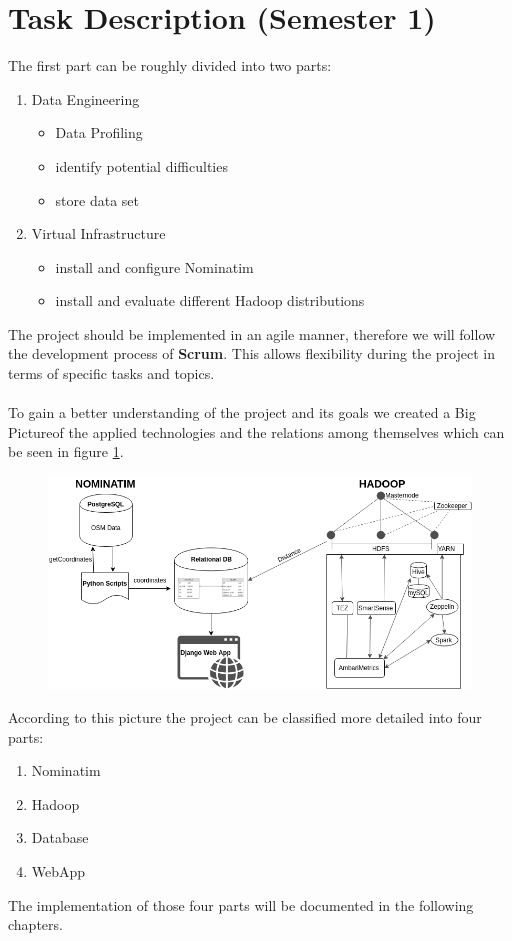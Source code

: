 
\section{Task Description (Semester 1)}\label{tasks}

The first part can be roughly divided into two parts:
\begin{enumerate}
\item Data Engineering
\begin{itemize}
\item Data Profiling
\item identify potential difficulties
\item store data set
\end{itemize}
\item Virtual Infrastructure
\begin{itemize}
\item install and configure Nominatim
\item install and evaluate different Hadoop distributions
\end{itemize}
\end{enumerate}
The project should be implemented in an agile manner, therefore we will follow the development process of \textbf{Scrum}. This allows flexibility during the project in terms of specific tasks and topics.
\\\\
To gain a better understanding of the project and its goals we created a \glqq Big Picture\grqq of the applied technologies and the relations among themselves which can be seen in figure \ref{fig:big}.

\begin{figure}[H]
\hspace{-0.9cm}
\includegraphics[width=1.1\textwidth]{img/big}
\label{fig:big}
\end{figure}
\noindent According to this picture the project can be classified more detailed into four parts:
\begin{enumerate}
\item Nominatim
\item Hadoop
\item Database
\item WebApp
\end{enumerate}
The implementation of those four parts will be documented in the following chapters.
